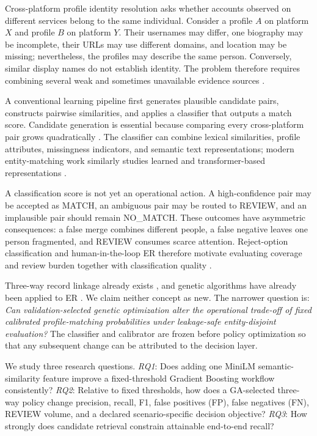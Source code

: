 \documentclass[conference]{IEEEtran}
\begin{document}
Cross-platform profile identity resolution asks whether accounts observed on different services belong to the same individual. Consider a profile $A$ on platform $X$ and profile $B$ on platform $Y$. Their usernames may differ, one biography may be incomplete, their URLs may use different domains, and location may be missing; nevertheless, the profiles may describe the same person. Conversely, similar display names do not establish identity. The problem therefore requires combining several weak and sometimes unavailable evidence sources \cite{shu2017uilreview,yao2023profile}.

A conventional learning pipeline first generates plausible candidate pairs, constructs pairwise similarities, and applies a classifier that outputs a match score. Candidate generation is essential because comparing every cross-platform pair grows quadratically \cite{papadakis2021blocking,li2020blocking}. The classifier can combine lexical similarities, profile attributes, missingness indicators, and semantic text representations; modern entity-matching work similarly studies learned and transformer-based representations \cite{barlaug2021survey,li2020ditto}.

A classification score is not yet an operational action. A high-confidence pair may be accepted as MATCH, an ambiguous pair may be routed to REVIEW, and an implausible pair should remain NO\_MATCH. These outcomes have asymmetric consequences: a false merge combines different people, a false negative leaves one person fragmented, and REVIEW consumes scarce attention. Reject-option classification and human-in-the-loop ER therefore motivate evaluating coverage and review burden together with classification quality \cite{hendrickx2024reject,qian2019systemer}.

Three-way record linkage already exists \cite{ouyang2019threeway}, and genetic algorithms have already been applied to ER \cite{sun2017gaer}. We claim neither concept as new. The narrower question is: \emph{Can validation-selected genetic optimization alter the operational trade-off of fixed calibrated profile-matching probabilities under leakage-safe entity-disjoint evaluation?} The classifier and calibrator are frozen before policy optimization so that any subsequent change can be attributed to the decision layer.

We study three research questions. \emph{RQ1}: Does adding one MiniLM semantic-similarity feature improve a fixed-threshold Gradient Boosting workflow consistently? \emph{RQ2}: Relative to fixed thresholds, how does a GA-selected three-way policy change precision, recall, F1, false positives (FP), false negatives (FN), REVIEW volume, and a declared scenario-specific decision objective? \emph{RQ3}: How strongly does candidate retrieval constrain attainable end-to-end recall?
\end{document}
